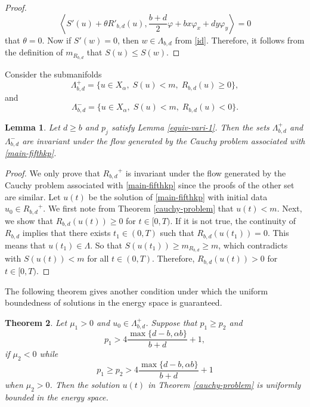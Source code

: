 \documentclass[10pt]{article}
\numberwithin{equation}{section}
\newtheorem{theorem}{\quad Theorem}[section]
\newtheorem{lemma}[theorem]{\quad Lemma}
\newcommand{\ff}{\varphi}
\newcommand{\la}{\langle}
\newcommand{\ra}{\rangle}
\newcommand{\x}{{X_\alpha}}
\newcommand{\moo}{\mu_2}  \newcommand{\poo}{{p_2}}
\newcommand{\al}{\alpha}
\newcommand{\rrr}{{R_{b,d}}}
\begin{document}
\begin{proof}
		\[
		\left\la S'(u)+\theta R'_{b,d}(u),\frac{b+d}{2}\ff+bx\ff_x+dy\ff_y\right\ra=0
		\]
		that $\theta=0$. Now if  $S'(w)=0$, then  $w\in \Lambda_{b,d}$ from \eqref{id}. Therefore, it follows from the definition of $m_\rrr$ that $S(u)\leq S(w)$.
	\end{proof}
	
	Consider the submanifolds
	\[
	\Lambda_{b,d}^+=\{u\in\x,\;S(u)<m,\;\rrr(u)\geq0\},
	\]and
	\[
	\Lambda_{b,d}^-=\{u\in\x,\;S(u)<m,\;\rrr(u)<0\}.
	\]
	
	\begin{lemma}\label{invar-set}
		Let $d\geq b$ and $p_j$ satisfy Lemma \ref{equiv-vari-1}. Then the sets $\Lambda_{b,d}^+$ and  $\Lambda_{b,d}^-$ are invariant under the flow generated by the Cauchy problem associated with \eqref{main-fifthkp}.
		
	\end{lemma}
	
	\begin{proof}
		We only prove that $\rrr^+$ is invariant under the flow generated by the Cauchy problem associated with  \eqref{main-fifthkp} since the proofs of the other set are similar. Let $u(t)$ be the solution of \eqref{main-fifthkp} with initial data $u_0\in \rrr^+$. We first note from Theorem \ref{cauchy-problem} that $u(t)<m$. Next, we show that $\rrr(u(t))\geq0$ for $t\in[0,T)$. If it is not true, the continuity of $\rrr$ implies that there exists $t_1\in(0,T)$ such that $\rrr(u(t_1))=0$. This means that $u(t_1)\in\Lambda$. So that $S(u(t_1))\geq m_{\rrr}\geq m$, which contradicts with $S(u(t))<m$ for all $t\in(0,T)$. Therefore, $\rrr(u(t))>0$ for $t\in[0,T)$.
	\end{proof}
	
	The following theorem gives another condition under which the uniform boundedness of solutions in the energy space is guaranteed.
	\begin{theorem}
		Let $\mu_1>0$ and $u_0\in \Lambda_{b,d}^+$.	Suppose that  $p_1\geq p_2$ and
		\[
		p_1>4\frac{\max\{d-b,\al b\}}{b+d}+1,
		\]
		if $\moo<0$ while
		\[
		p_1\geq p_2>4\frac{\max\{d-b,\al b\}}{b+d}+1
		\]
		when $\mu_2>0$.
		Then the solution $u(t)$ in Theorem \ref{cauchy-problem} is uniformly bounded in the energy space.
	\end{theorem}
	
\end{document}
